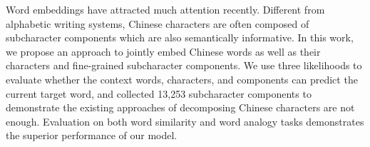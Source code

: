 Word embeddings have attracted much attention recently. Different from alphabetic writing systems, Chinese characters are often composed of subcharacter components which are also semantically informative. In this work, we propose an approach to jointly embed Chinese words as well as their characters and fine-grained subcharacter components. We use three likelihoods to evaluate whether the context words, characters, and components can predict the current target word, and collected 13,253 subcharacter components to demonstrate the existing approaches of decomposing Chinese characters are not enough. Evaluation on both word similarity and word analogy tasks demonstrates the superior performance of our model.
